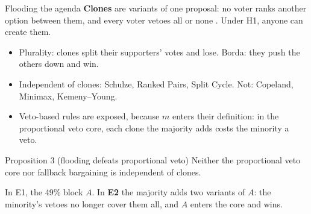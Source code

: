 \documentclass[10pt,aspectratio=169]{beamer}
\begin{document}
\begin{frame}{Flooding the agenda}
  \textbf{Clones} are variants of one proposal: no voter ranks another option between them, and every voter
  vetoes all or none . Under H1, anyone can create them.
  \begin{itemize}
    \item Plurality: clones split their supporters' votes and lose. Borda: they push the others down and win.
    \item Independent of clones: Schulze, Ranked Pairs, Split Cycle. Not: Copeland, Minimax, Kemeny--Young.
    \item Veto-based rules are exposed, because $m$ enters their definition: in the proportional veto core,
      each clone the majority adds costs the minority a veto.
  \end{itemize}
  \begin{block}{Proposition 3 (flooding defeats proportional veto)}
    Neither the proportional veto core nor fallback bargaining is independent of clones.
  \end{block}
  In E1, the 49\% block $A$. In \textbf{E2} the majority adds two variants of $A$: the minority's vetoes no
  longer cover them all, and $A$ enters the core and wins.
\end{frame}
\end{document}
